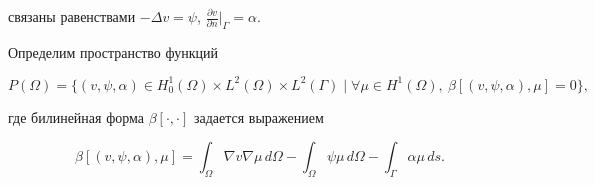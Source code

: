 связаны равенствами $-\Delta v=\psi$, $\frac{\partial v}{\partial 


n}\big|_\Gamma=\alpha$. 


 


Определим пространство функций 


\begin{equation} 


P(\Omega)=\{(v,\psi,\alpha)\in H^1_0(\Omega)\times L^2(\Omega)\times 


L^2(\Gamma)\mid \forall\mu\in H^1(\Omega), 


\ \beta[(v,\psi,\alpha),\mu]=0\}, 


\end{equation} 


где билинейная форма $\beta[\cdot,\cdot]$ задается выражением 


$$ 


\beta[(v,\psi,\alpha),\mu]=\int_\Omega\nabla v\nabla\mu\,d\Omega- 


\int_\Omega \psi\mu\,d\Omega-\int_\Gamma \alpha\mu\,ds. 


$$ 


 


